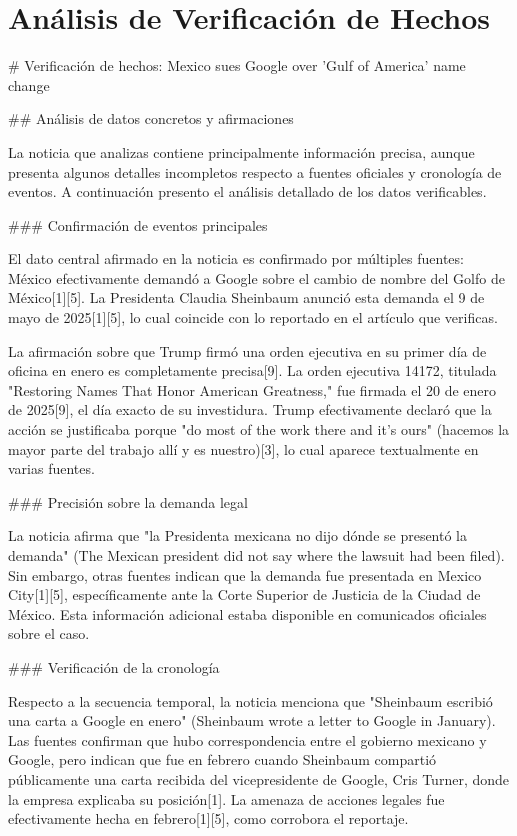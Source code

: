 \documentclass[10pt,a4paper]{article}
\begin{document}
\section*{Análisis de Verificación de Hechos}
    \# Verificaci\'{o}n de hechos: Mexico sues Google over 'Gulf of America' name change
\par\medskip
\#\# An\'{a}lisis de datos concretos y afirmaciones
\par\medskip
La noticia que analizas contiene principalmente informaci\'{o}n precisa, aunque presenta algunos detalles incompletos respecto a fuentes oficiales y cronolog\'{i}a de eventos. A continuaci\'{o}n presento el an\'{a}lisis detallado de los datos verificables.
\par\medskip
\#\#\# Confirmaci\'{o}n de eventos principales
\par\medskip
El dato central afirmado en la noticia es confirmado por m\'{u}ltiples fuentes: M\'{e}xico efectivamente demand\'{o} a Google sobre el cambio de nombre del Golfo de M\'{e}xico[1][5]. La Presidenta Claudia Sheinbaum anunci\'{o} esta demanda el 9 de mayo de 2025[1][5], lo cual coincide con lo reportado en el art\'{i}culo que verificas.
\par\medskip
La afirmaci\'{o}n sobre que Trump firm\'{o} una orden ejecutiva en su primer d\'{i}a de oficina en enero es completamente precisa[9]. La orden ejecutiva 14172, titulada "Restoring Names That Honor American Greatness," fue firmada el 20 de enero de 2025[9], el d\'{i}a exacto de su investidura. Trump efectivamente declar\'{o} que la acci\'{o}n se justificaba porque "do most of the work there and it's ours" (hacemos la mayor parte del trabajo all\'{i} y es nuestro)[3], lo cual aparece textualmente en varias fuentes.
\par\medskip
\#\#\# Precisi\'{o}n sobre la demanda legal
\par\medskip
La noticia afirma que "la Presidenta mexicana no dijo d\'{o}nde se present\'{o} la demanda" (The Mexican president did not say where the lawsuit had been filed). Sin embargo, otras fuentes indican que la demanda fue presentada en Mexico City[1][5], espec\'{i}ficamente ante la Corte Superior de Justicia de la Ciudad de M\'{e}xico. Esta informaci\'{o}n adicional estaba disponible en comunicados oficiales sobre el caso.
\par\medskip
\#\#\# Verificaci\'{o}n de la cronolog\'{i}a
\par\medskip
Respecto a la secuencia temporal, la noticia menciona que "Sheinbaum escribi\'{o} una carta a Google en enero" (Sheinbaum wrote a letter to Google in January). Las fuentes confirman que hubo correspondencia entre el gobierno mexicano y Google, pero indican que fue en febrero cuando Sheinbaum comparti\'{o} p\'{u}blicamente una carta recibida del vicepresidente de Google, Cris Turner, donde la empresa explicaba su posici\'{o}n[1]. La amenaza de acciones legales fue efectivamente hecha en febrero[1][5], como corrobora el reportaje.
\end{document}
